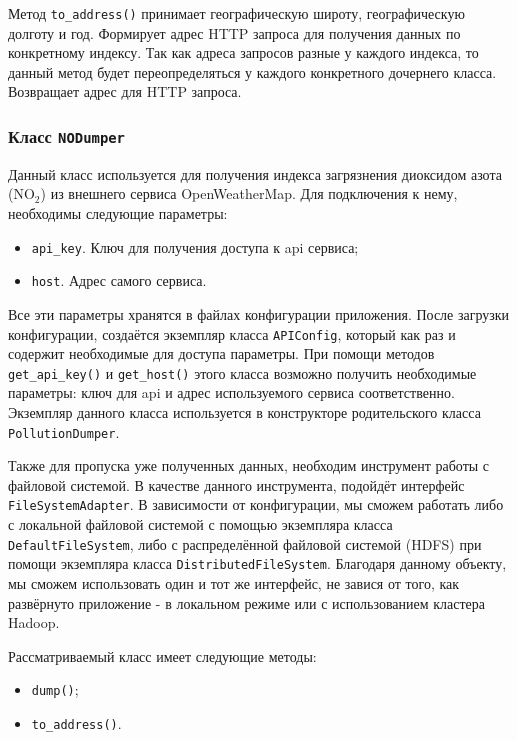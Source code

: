 Метод \texttt{to\_address()} принимает географическую широту, географическую долготу и год.
Формирует адрес HTTP запроса для получения данных по конкретному индексу.
Так как адреса запросов разные у каждого индекса, то данный метод будет переопределяться у каждого конкретного дочернего класса.
Возвращает адрес для HTTP запроса.




\subsubsection{Класс \texttt{NODumper}}
Данный класс используется для получения индекса загрязнения диоксидом азота ($ \text{NO}_{\text{2}} $) из внешнего сервиса OpenWeatherMap.
Для подключения к нему, необходимы следующие параметры:

\begin{itemize}
\item \texttt{api\_key}. Ключ для получения доступа к api сервиса;
\item \texttt{host}. Адрес самого сервиса.
\end{itemize}

Все эти параметры хранятся в файлах конфигурации приложения.
После загрузки конфигурации, создаётся экземпляр класса \texttt{APIConfig}, который как раз и содержит необходимые для доступа параметры.
При помощи методов \texttt{get\_api\_key()} и \texttt{get\_host()} этого класса возможно получить необходимые параметры: ключ для api и адрес используемого сервиса соответственно.
Экземпляр данного класса используется в конструкторе родительского класса \texttt{PollutionDumper}.

Также для пропуска уже полученных данных, необходим инструмент работы с файловой системой.
В качестве данного инструмента, подойдёт интерфейс \texttt{FileSystemAdapter}.
В зависимости от конфигурации, мы сможем работать либо с локальной файловой системой с помощью экземпляра класса \texttt{DefaultFileSystem}, либо с распределённой файловой системой (HDFS) при помощи экземпляра класса \texttt{DistributedFileSystem}.
Благодаря данному объекту, мы сможем использовать один и тот же интерфейс, не завися от того, как развёрнуто приложение - в локальном режиме или с использованием кластера Hadoop.

Рассматриваемый класс имеет следующие методы:
\begin{itemize}
\item \texttt{dump()};
\item \texttt{to\_address()}.
\end{itemize}

